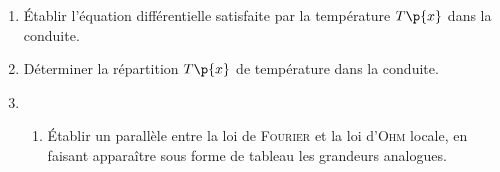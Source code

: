 \documentclass[a4paper,french,bookmarks]{article}
\begin{document}
    \begin{enumerate}
        \item Établir l'équation différentielle satisfaite par la température $T\p{x}$ dans la conduite.
        
        \noafter
        \nobefore\yesafter
        \boxansconc{
            \[ \dfrac{\partial^2 T}{\partial x^2}\p{x} = 0\]
        }
        \yesbefore
        
        \item Déterminer la répartition $T\p{x}$ de température dans la conduite.
        
        
        \item \begin{enumerate}
            \item Établir un parallèle entre la loi de \textsc{Fourier} et la loi d'\textsc{Ohm} locale, en faisant apparaître sous forme de tableau les grandeurs analogues.
            

\end{enumerate}
\end{enumerate}
\end{document}

